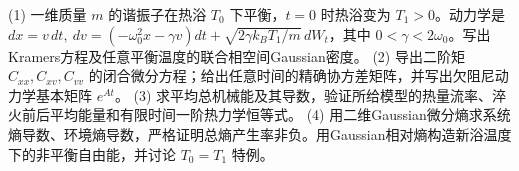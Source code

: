 (1) 一维质量 \(m\) 的谐振子在热浴 \(T_0\) 下平衡，\(t=0\) 时热浴变为 \(T_1>0\)。动力学是 \(dx=v\,dt,\ dv=(-\omega_0^2x-\gamma v)dt+\sqrt{2\gamma k_BT_1/m}\,dW_t\)，其中 \(0<\gamma<2\omega_0\)。写出Kramers方程及任意平衡温度的联合相空间Gaussian密度。
(2) 导出二阶矩 \(C_{xx},C_{xv},C_{vv}\) 的闭合微分方程；给出任意时间的精确协方差矩阵，并写出欠阻尼动力学基本矩阵 \(e^{At}\)。
(3) 求平均总机械能及其导数，验证所给模型的热量流率、淬火前后平均能量和有限时间一阶热力学恒等式。
(4) 用二维Gaussian微分熵求系统熵导数、环境熵导数，严格证明总熵产生率非负。用Gaussian相对熵构造新浴温度下的非平衡自由能，并讨论 \(T_0=T_1\) 特例。
